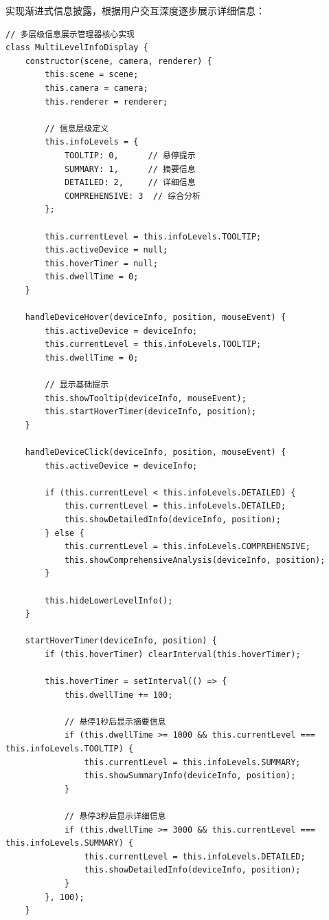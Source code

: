 
实现渐进式信息披露，根据用户交互深度逐步展示详细信息：

\begin{lstlisting}[style=javascript]
// 多层级信息展示管理器核心实现
class MultiLevelInfoDisplay {
    constructor(scene, camera, renderer) {
        this.scene = scene;
        this.camera = camera;
        this.renderer = renderer;
        
        // 信息层级定义
        this.infoLevels = {
            TOOLTIP: 0,      // 悬停提示
            SUMMARY: 1,      // 摘要信息
            DETAILED: 2,     // 详细信息
            COMPREHENSIVE: 3  // 综合分析
        };
        
        this.currentLevel = this.infoLevels.TOOLTIP;
        this.activeDevice = null;
        this.hoverTimer = null;
        this.dwellTime = 0;
    }
    
    handleDeviceHover(deviceInfo, position, mouseEvent) {
        this.activeDevice = deviceInfo;
        this.currentLevel = this.infoLevels.TOOLTIP;
        this.dwellTime = 0;
        
        // 显示基础提示
        this.showTooltip(deviceInfo, mouseEvent);
        this.startHoverTimer(deviceInfo, position);
    }
    
    handleDeviceClick(deviceInfo, position, mouseEvent) {
        this.activeDevice = deviceInfo;
        
        if (this.currentLevel < this.infoLevels.DETAILED) {
            this.currentLevel = this.infoLevels.DETAILED;
            this.showDetailedInfo(deviceInfo, position);
        } else {
            this.currentLevel = this.infoLevels.COMPREHENSIVE;
            this.showComprehensiveAnalysis(deviceInfo, position);
        }
        
        this.hideLowerLevelInfo();
    }
    
    startHoverTimer(deviceInfo, position) {
        if (this.hoverTimer) clearInterval(this.hoverTimer);
        
        this.hoverTimer = setInterval(() => {
            this.dwellTime += 100;
            
            // 悬停1秒后显示摘要信息
            if (this.dwellTime >= 1000 && this.currentLevel === this.infoLevels.TOOLTIP) {
                this.currentLevel = this.infoLevels.SUMMARY;
                this.showSummaryInfo(deviceInfo, position);
            }
            
            // 悬停3秒后显示详细信息
            if (this.dwellTime >= 3000 && this.currentLevel === this.infoLevels.SUMMARY) {
                this.currentLevel = this.infoLevels.DETAILED;
                this.showDetailedInfo(deviceInfo, position);
            }
        }, 100);
    }
    

\end{lstlisting}
